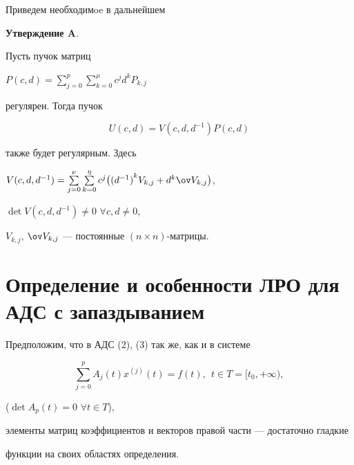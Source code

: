 Приведем необходимoe в дальнейшем


\medskip





{\bf Утверждение A}. {\it


Пусть пучок матриц


$P(c,d)=\sum\limits_{j=0}^{p}{\sum\limits_{k=0}^{\mu}{c^j d^k P_{k,j}}}$


регулярен. Тогда пучок


$$


U(c,d)=V(c,d,d^{-1}) P(c,d)


$$


также будет регулярным. Здесь


$V(c,d,d^{-1})=


\sum\limits_{j=0}^{\nu }{\sum\limits_{k=0}^{\eta }{c^j


\big( {(d^{-1})}^k V_{k,j}+


d^k \ov V_{k,j} \big) }}$,


$\det V(c,d,d^{-1}) \ne 0$\; $\forall c,d \ne 0$,


$V_{k,j}$, $\ov V_{k,j}$ --- постоянные $(n \times n)$-матрицы.


}





\section{Определение и особенности ЛРО для АДС с запаздыванием}





Предположим, что в АДС (2), (3) так же, как и в системе


\begin{equation}


\sum_{j=0}^{p}{A_j(t)x^{(j)}(t)}=f(t),\ \ t \in T=[t_0, +\infty ),


\end{equation}


($\det A_p(t) =0$\; $\forall t \in T$), 


элементы матриц коэффициентов и векторов правой части --- достаточно гладкие 


функции на своих областях определения.





